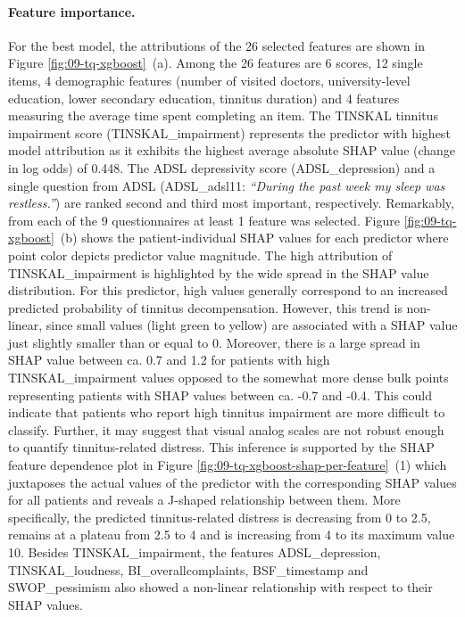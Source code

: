 \documentclass[
  oneside]{book}
\begin{document}
\paragraph*{Feature importance.}

For the best model, the attributions of the 26 selected features are shown in Figure \ref{fig:09-tq-xgboost}~(a).
Among the 26 features are 6 scores, 12 single items, 4 demographic features (number of visited doctors, university-level education, lower secondary education, tinnitus duration) and 4 features measuring the average time spent completing an item.
The TINSKAL tinnitus impairment score (TINSKAL\_impairment) represents the predictor with highest model attribution as it exhibits the highest average absolute SHAP value (change in log odds) of 0.448.
The ADSL depressivity score (ADSL\_depression) and a single question from ADSL (ADSL\_adsl11: \emph{``During the past week my sleep was restless.''}) are ranked second and third most important, respectively.
Remarkably, from each of the 9 questionnaires at least 1 feature was selected.
Figure \ref{fig:09-tq-xgboost}~(b) shows the patient-individual SHAP values for each predictor where point color depicts predictor value magnitude.
The high attribution of TINSKAL\_impairment is highlighted by the wide spread in the SHAP value distribution.
For this predictor, high values generally correspond to an increased predicted probability of tinnitus decompensation.
However, this trend is non-linear, since small values (light green to yellow) are associated with a SHAP value just slightly smaller than or equal to 0.
Moreover, there is a large spread in SHAP value between ca. 0.7 and 1.2 for patients with high TINSKAL\_impairment values opposed to the somewhat more dense bulk points representing patients with SHAP values between ca. -0.7 and -0.4.
This could indicate that patients who report high tinnitus impairment are more difficult to classify.
Further, it may suggest that visual analog scales are not robust enough to quantify tinnitus-related distress.
This inference is supported by the SHAP feature dependence plot in Figure \ref{fig:09-tq-xgboost-shap-per-feature}~(1) which juxtaposes the actual values of the predictor with the corresponding SHAP values for all patients and reveals a J-shaped relationship between them.
More specifically, the predicted tinnitus-related distress is decreasing from 0 to 2.5, remains at a plateau from 2.5 to 4 and is increasing from 4 to its maximum value 10.
Besides TINSKAL\_impairment, the features ADSL\_depression, TINSKAL\_loudness, BI\_overallcomplaints, BSF\_timestamp and SWOP\_pessimism also showed a non-linear relationship with respect to their SHAP values.
\end{document}
